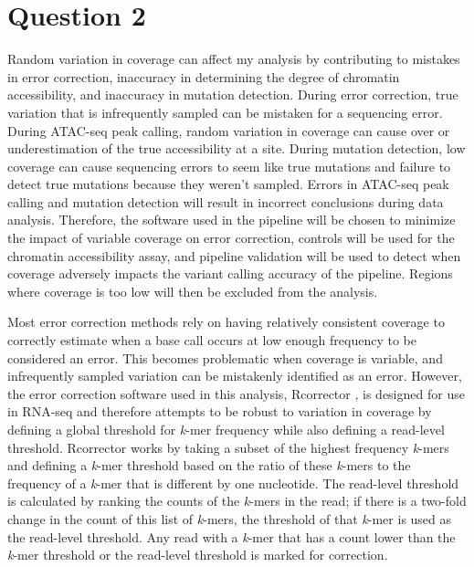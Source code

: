 \section{Question 2}
Random variation in coverage can affect my analysis by contributing to mistakes in error correction, inaccuracy in determining the degree of chromatin accessibility, and inaccuracy in mutation detection. During error correction, true variation that is infrequently sampled can be mistaken for a sequencing error. During ATAC-seq peak calling, random variation in coverage can cause over or underestimation of the true accessibility at a site. During mutation detection, low coverage can cause sequencing errors to seem like true mutations and failure to detect true mutations because they weren't sampled. Errors in ATAC-seq peak calling and mutation detection will result in incorrect conclusions during data analysis. Therefore, the software used in the pipeline will be chosen to minimize the impact of variable coverage on error correction, controls will be used for the chromatin accessibility assay, and pipeline validation will be used to detect when coverage adversely impacts the variant calling accuracy of the pipeline. Regions where coverage is too low will then be excluded from the analysis.

Most error correction methods rely on having relatively consistent coverage to correctly estimate when a base call occurs at low enough frequency to be considered an error. This becomes problematic when coverage is variable, and infrequently sampled variation can be mistakenly identified as an error. However, the error correction software used in this analysis, Rcorrector \parencite{song_rcorrector:_2015}, is designed for use in RNA-seq and therefore attempts to be robust to variation in coverage by defining a global threshold for \textit{k}-mer frequency while also defining a read-level threshold.
Rcorrector works by taking a subset of the highest frequency \textit{k}-mers and defining a \textit{k}-mer threshold based on the ratio of these \textit{k}-mers to the frequency of a \textit{k}-mer that is different by one nucleotide. The read-level threshold is calculated by ranking the counts of the \textit{k}-mers in the read; if there is a two-fold change in the count of this list of \textit{k}-mers, the threshold of that \textit{k}-mer is used as the read-level threshold. Any read with a \textit{k}-mer that has a count lower than the \textit{k}-mer threshold or the read-level threshold is marked for correction. 

